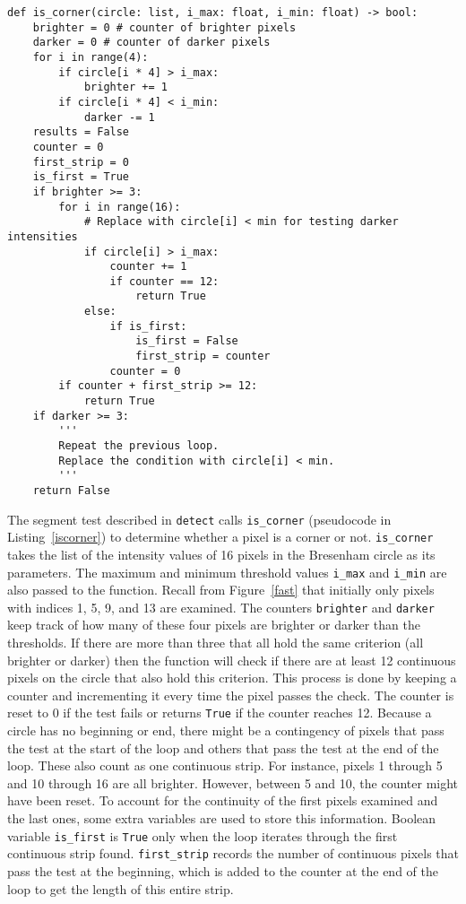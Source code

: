 \vspace{-.2 in}
\begin{singlespace}
\begin{lstlisting}[mathescape, caption= Check for corner at pixel with given Bresenham circle, label=iscorner]
def is_corner(circle: list, i_max: float, i_min: float) -> bool:
    brighter = 0 # counter of brighter pixels
    darker = 0 # counter of darker pixels
    for i in range(4):
        if circle[i * 4] > i_max:
            brighter += 1
        if circle[i * 4] < i_min:
            darker -= 1
    results = False
    counter = 0
    first_strip = 0
    is_first = True
    if brighter >= 3:
        for i in range(16):    
            # Replace with circle[i] < min for testing darker intensities
            if circle[i] > i_max: 
                counter += 1
                if counter == 12:
                    return True
            else:
                if is_first:
                    is_first = False
                    first_strip = counter
                counter = 0
        if counter + first_strip >= 12:
            return True
    if darker >= 3:
        '''
        Repeat the previous loop. 
        Replace the condition with circle[i] < min.
        '''
    return False
\end{lstlisting}
\end{singlespace}

The segment test described in \texttt{detect} calls \texttt{is\_corner} (pseudocode in Listing~\ref{iscorner}) to determine whether a pixel is a corner or not. \texttt{is\_corner} takes the list of the intensity values of 16 pixels in the Bresenham circle as its parameters.  The maximum and minimum threshold values \texttt{i\_max} and \texttt{i\_min} are also passed to the function. Recall from Figure~\ref{fast} that initially only pixels with indices 1, 5, 9, and 13 are examined. The counters \texttt{brighter} and \texttt{darker} keep track of how many of these four pixels are brighter or darker than the thresholds. If there are more than three that all hold the same criterion (all brighter or darker) then the function will check if there are at least 12 continuous pixels on the circle that also hold this criterion. This process is done by keeping a counter and incrementing it every time the pixel passes the check. The counter is reset to 0 if the test fails or returns \texttt{True} if the counter reaches 12. Because a circle has no beginning or end, there might be a contingency of pixels that pass the test at the start of the loop and others that pass the test at the end of the loop. These also count as one continuous strip. For instance, pixels 1 through 5 and 10 through 16 are all brighter. However, between 5 and 10, the counter might have been reset. To account for the continuity of the first pixels examined and the last ones, some extra variables are used to store this information. Boolean variable \texttt{is\_first} is \texttt{True} only when the loop iterates through the first continuous strip found. \texttt{first\_strip} records the number of continuous pixels that pass the test at the beginning, which is added to the counter at the end of the loop to get the length of this entire strip.

